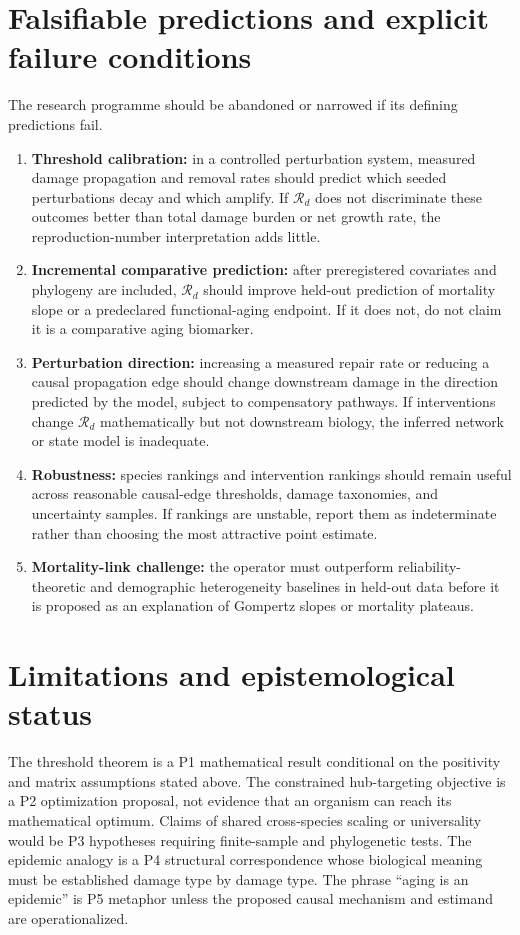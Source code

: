\documentclass[11pt,a4paper]{article}
\newcommand{\Rd}{\mathcal{R}_{d}}
\begin{document}
\section{Falsifiable predictions and explicit failure conditions}
The research programme should be abandoned or narrowed if its defining predictions fail.
\begin{enumerate}
\item \textbf{Threshold calibration:} in a controlled perturbation system, measured damage propagation and removal rates should predict which seeded perturbations decay and which amplify. If $\Rd$ does not discriminate these outcomes better than total damage burden or net growth rate, the reproduction-number interpretation adds little.
\item \textbf{Incremental comparative prediction:} after preregistered covariates and phylogeny are included, $\Rd$ should improve held-out prediction of mortality slope or a predeclared functional-aging endpoint. If it does not, do not claim it is a comparative aging biomarker.
\item \textbf{Perturbation direction:} increasing a measured repair rate or reducing a causal propagation edge should change downstream damage in the direction predicted by the model, subject to compensatory pathways. If interventions change $\Rd$ mathematically but not downstream biology, the inferred network or state model is inadequate.
\item \textbf{Robustness:} species rankings and intervention rankings should remain useful across reasonable causal-edge thresholds, damage taxonomies, and uncertainty samples. If rankings are unstable, report them as indeterminate rather than choosing the most attractive point estimate.
\item \textbf{Mortality-link challenge:} the operator must outperform reliability-theoretic and demographic heterogeneity baselines in held-out data before it is proposed as an explanation of Gompertz slopes or mortality plateaus.
\end{enumerate}

\section{Limitations and epistemological status}
The threshold theorem is a P1 mathematical result conditional on the positivity and matrix assumptions stated above. The constrained hub-targeting objective is a P2 optimization proposal, not evidence that an organism can reach its mathematical optimum. Claims of shared cross-species scaling or universality would be P3 hypotheses requiring finite-sample and phylogenetic tests. The epidemic analogy is a P4 structural correspondence whose biological meaning must be established damage type by damage type. The phrase “aging is an epidemic” is P5 metaphor unless the proposed causal mechanism and estimand are operationalized.
\end{document}
